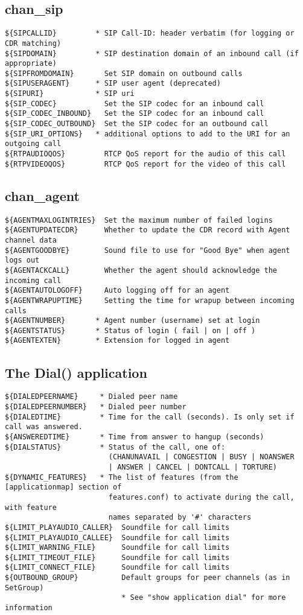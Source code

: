 \subsection{chan\_sip}
\begin{verbatim}
${SIPCALLID}         * SIP Call-ID: header verbatim (for logging or CDR matching)
${SIPDOMAIN}         * SIP destination domain of an inbound call (if appropriate)
${SIPFROMDOMAIN}       Set SIP domain on outbound calls
${SIPUSERAGENT}      * SIP user agent (deprecated)
${SIPURI}            * SIP uri
${SIP_CODEC}           Set the SIP codec for an inbound call
${SIP_CODEC_INBOUND}   Set the SIP codec for an inbound call
${SIP_CODEC_OUTBOUND}  Set the SIP codec for an outbound call
${SIP_URI_OPTIONS}   * additional options to add to the URI for an outgoing call
${RTPAUDIOQOS}         RTCP QoS report for the audio of this call
${RTPVIDEOQOS}         RTCP QoS report for the video of this call
\end{verbatim}

\subsection{chan\_agent}
\begin{verbatim}
${AGENTMAXLOGINTRIES}  Set the maximum number of failed logins
${AGENTUPDATECDR}      Whether to update the CDR record with Agent channel data
${AGENTGOODBYE}        Sound file to use for "Good Bye" when agent logs out
${AGENTACKCALL}        Whether the agent should acknowledge the incoming call
${AGENTAUTOLOGOFF}     Auto logging off for an agent
${AGENTWRAPUPTIME}     Setting the time for wrapup between incoming calls
${AGENTNUMBER}       * Agent number (username) set at login
${AGENTSTATUS}       * Status of login ( fail | on | off )
${AGENTEXTEN}        * Extension for logged in agent
\end{verbatim}


\subsection{The Dial() application}
\begin{verbatim}
${DIALEDPEERNAME}     * Dialed peer name
${DIALEDPEERNUMBER}   * Dialed peer number
${DIALEDTIME}         * Time for the call (seconds). Is only set if call was answered.
${ANSWEREDTIME}       * Time from answer to hangup (seconds)
${DIALSTATUS}         * Status of the call, one of:
                        (CHANUNAVAIL | CONGESTION | BUSY | NOANSWER
                        | ANSWER | CANCEL | DONTCALL | TORTURE)
${DYNAMIC_FEATURES}   * The list of features (from the [applicationmap] section of
                        features.conf) to activate during the call, with feature
                        names separated by '#' characters
${LIMIT_PLAYAUDIO_CALLER}  Soundfile for call limits
${LIMIT_PLAYAUDIO_CALLEE}  Soundfile for call limits
${LIMIT_WARNING_FILE}      Soundfile for call limits
${LIMIT_TIMEOUT_FILE}      Soundfile for call limits
${LIMIT_CONNECT_FILE}      Soundfile for call limits
${OUTBOUND_GROUP}          Default groups for peer channels (as in SetGroup)
                           * See "show application dial" for more information
\end{verbatim}

